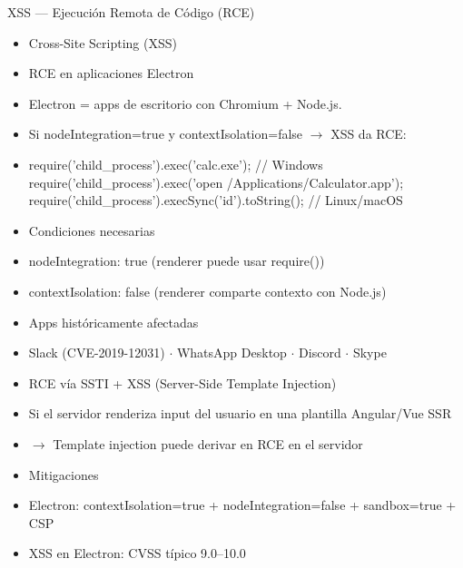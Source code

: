 \documentclass[aspectratio=169,10pt]{beamer}
\newcommand{\cmdbox}[1]{%
  \begin{center}%
  {\setlength{\fboxsep}{6pt}\colorbox{uzlav!40}{\parbox{0.88\linewidth}{\ttfamily\footnotesize #1}}}%
  \end{center}}
\begin{document}
\begin{frame}[allowframebreaks]{XSS --- Ejecución Remota de Código (RCE)}
\small
  \begin{itemize}
  \item Cross-Site Scripting (XSS)
  \item RCE en aplicaciones Electron
  \item Electron = apps de escritorio con Chromium + Node.js.
  \item Si nodeIntegration=true y contextIsolation=false $\rightarrow$ XSS da RCE:
  \item[] \cmdbox{require('child\_process').exec('calc.exe'); // Windows\\{}
require('child\_process').exec('open /Applications/Calculator.app');\\{}
require('child\_process').execSync('id').toString(); // Linux/macOS}
  \item Condiciones necesarias
  \item nodeIntegration: true (renderer puede usar require())
  \item contextIsolation: false (renderer comparte contexto con Node.js)
  \item Apps históricamente afectadas
  \item Slack (CVE-2019-12031) $\cdot$ WhatsApp Desktop $\cdot$ Discord $\cdot$ Skype
  \item RCE vía SSTI + XSS (Server-Side Template Injection)
  \item Si el servidor renderiza input del usuario en una plantilla Angular/Vue SSR
  \item $\rightarrow$ Template injection puede derivar en RCE en el servidor
  \item Mitigaciones
  \item Electron: contextIsolation=true + nodeIntegration=false + sandbox=true + CSP
  \item XSS en Electron: CVSS típico 9.0--10.0
  \end{itemize}
\end{frame}
\end{document}
